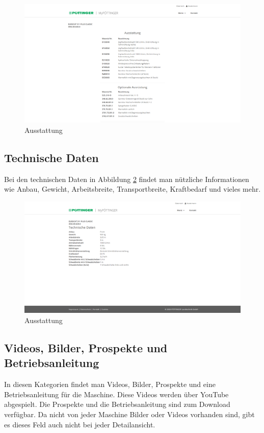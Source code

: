 \begin{figure}[H]
	\centerline{
		\includegraphics[width=1\textwidth, frame]{./grafiken/erm_detailansicht_ausstattung.PNG}
	}
	\vskip0pt
	\caption{Ausstattung} \label{fig:ausstattung}
\end{figure}

\subsection{Technische Daten}

Bei den technischen Daten in Abbildung \ref{fig:technischeDaten} findet man nützliche Informationen wie Anbau, Gewicht, Arbeitsbreite, Transportbreite, Kraftbedarf und vieles mehr.

\begin{figure}[H]
	\centerline{
		\includegraphics[width=1\textwidth, frame]{./grafiken/erm_detailansicht_technisch.PNG}
	}
	\vskip0pt
	\caption{Ausstattung} \label{fig:technischeDaten}
\end{figure}
\subsection{Videos, Bilder, Prospekte und Betriebsanleitung}
In diesen Kategorien findet man Videos, Bilder, Prospekte und eine Betriebsanleitung für die Maschine. Diese Videos werden über YouTube abgespielt. Die Prospekte und die Betriebsanleitung sind zum Download verfügbar. Da nicht von jeder Maschine Bilder oder Videos vorhanden sind, gibt es dieses Feld auch nicht bei jeder Detailansicht.
